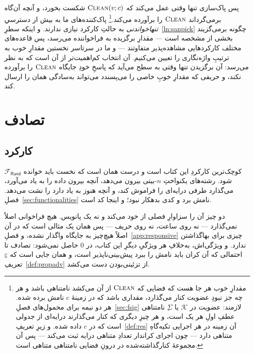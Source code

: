 \documentclass[10pt,oneside,openany]{book}
\newcommand{\op}[1]{\textnormal{\textsc{#1}}}
\newcommand{\Frand}{\mathcal{F}_{\mathsf{Rand}}}
\newcommand{\Keys}{\mathcal{K}}
\newcommand{\Sigs}{\Sigma}
\newcommand{\Clean}{\op{Clean}}
\theoremstyle{accentdef}
\theoremstyle{accentplain}
\begin{document}
پس پاک‌سازی تنها وقتی عمل می‌کند که $\Clean(v; c)$ شکست بخورد، و آنچه
آن‌گاه برمی‌گرداند $\Clean$ را برآورده می‌کند.\footnote{مقدارِ خوب هر جا
هست که فضایی که $\Clean$ از آن می‌کشد نامتناهی باشد و هر چه جز نبودِ عضویت
کنار می‌گذارد، مقداری باشد که در زمینهٔ $c$ نامش برده شده. هر دو نیمه برای
محمول‌های فصلِ~\ref{sec:fsig} لازمند: عضویت در $\Keys$ یا $\Sigs$ِ نامتناهی
عطفِ اولِ هر یک است، و هر چیزِ دیگری که کنار می‌گذارند درایه‌ای از جدولی است
که در $c$ داده شده. و زیرِ تعریفِ~\ref{def:res} آن زمینه در هر اجرایی
تکیه‌گاهِ متناهی دارد --- چون اجرای کراندار تعدادِ متناهی درایه ثبت می‌کند ---
پس آن مجموعهٔ کنارگذاشته‌شده در درونِ فضایی نامتناهی متناهی است.}
پاک‌کننده‌های ما به بیش از دسترسیِ \emph{تنها‌خواندنی} به حالتِ کارکرد نیازی
ندارند. و اینکه سطرِ~\ref{ln:sanpick} چگونه برمی‌گزیند بخشی از مشخصه است ---
مقدارِ برگزیده به فراخواننده می‌رسد، پس قاعده‌های مختلف کارکردهایی
مشاهده‌پذیر متفاوتند --- و ما در سرتاسر نخستین مقدارِ خوب به ترتیبِ
واژه‌نگاری را تعیین می‌کنیم. آن انتخاب کم‌اهمیت‌تر از آن است که به نظر
می‌رسد: آن برگزیدن تنها وقتی به سطح می‌آید که پاسخِ خودِ جایگاه $\Clean$ را
برآورده نکند، و حریفی که مقدارِ خوبِ خاصی را می‌پسندد می‌تواند به‌سادگی
همان را ارسال کند.

\chapter{تصادف}\label{sec:frand}

\section{کارکرد}\label{sec:frandfunc}

$\Frand$ کوچک‌ترین کارکردِ این کتاب است و درست همان است که نخست باید خوانده
شود. رشته‌های یکنواختِ $n$-بیتی بیرون می‌دهد، آنچه بیرون داده را به یاد
می‌آورد، می‌گذارد طرفی درایه‌ای را فراموش کند، و آنچه هنوز به یاد دارد را
نشت می‌دهد. فصلِ~\ref{sec:functionalities} نامش برد و کدی بدهکار نبود؛ و
اینجا کد است.

دو چیز آن را سزاوارِ فصلی از خود می‌کند و نه یک پانویس. هیچ فراخوانی اصلاً
نمی‌گذارد --- نه روی ساعت، نه روی حریف --- پس همان یک مثالی است که در آن
اصلاً هیچ‌چیز به جایگاه واگذار نشده، و فصلِ~\ref{app:responsive} چیزی برای
بها‌گذاشتن ندارد. و ویژگی‌اش، به‌خلافِ هر ویژگیِ دیگرِ این کتاب، در $0$
حاصل نمی‌شود: تصادف تا احتمالی که آن کران باید نامش را ببرد
پیش‌بینی‌ناپذیر است، و همان جایی است که $\varepsilon$ِ
تعریفِ~\ref{def:propadv} از تزئینی‌بودن دست می‌کشد.
\end{document}
